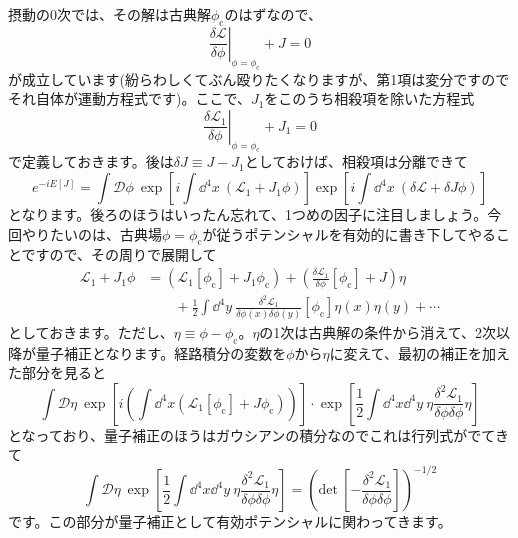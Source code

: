\documentclass[unicode,a4paper,11pt]{ltjsarticle}
\theoremstyle{definition}
\begin{document}
摂動の0次では、その解は古典解$\phi_{\mathrm{c}}$のはずなので、
\begin{equation}
   \left.
   \frac{\delta\mathcal{L}}{\delta\phi}
   \right|_{\phi=\phi_{\mathrm{c}}}
   +
   J
   =
   0
\end{equation}
が成立しています(紛らわしくてぶん殴りたくなりますが、第1項は変分ですのでそれ自体が運動方程式です)。ここで、$J_{1}$をこのうち相殺項を除いた方程式
\begin{equation}
   \left.
   \frac{\delta\mathcal{L}_1}{\delta\phi}
   \right|_{\phi=\phi_{\mathrm{c}}}
   +
   J_{1}
   =
   0
\end{equation}
で定義しておきます。後は$\delta J\equiv J-J_{1}$としておけば、相殺項は分離できて
\begin{equation}
   e^{-i E[J]}
   =
   \int\mathcal{D}\phi\
   \exp
   \left[
   i\int\dd^4 x\
   (\mathcal{L}_{1}+J_{1}\phi)
   \right]
   \exp
   \left[
      i\int\dd^4 x\
      (\delta\mathcal{L}+\delta J\phi)
      \right]
\end{equation}
となります。後ろのほうはいったん忘れて、1つめの因子に注目しましょう。今回やりたいのは、古典場$\phi=\phi_{\mathrm{c}}$が従うポテンシャルを有効的に書き下してやることですので、その周りで展開して
\begin{align}
   \mathcal{L}_{1}+J_{1}\phi
    & =
   \left(
   \mathcal{L}_{1}[\phi_{\mathrm{c}}]+J_{1}\phi_{\mathrm{c}}
   \right)
   +
   \left(
   \frac{\delta\mathcal{L}_{1}}{\delta\phi}[\phi_{\mathrm{c}}]
   +
   J
   \right)\eta
   \nonumber
   \\
    & \qquad
   +
   \frac{1}{2}\int\dd^4 y\
   \frac{\delta^2 \mathcal{L}_1}{\delta\phi(x)\delta\phi(y)}[\phi_{\mathrm{c}}]\eta(x)\eta(y)
   +
   \cdots
\end{align}
としておきます。ただし、$\eta\equiv\phi-\phi_{\mathrm{c}}$。$\eta$の1次は古典解の条件から消えて、2次以降が量子補正となります。経路積分の変数を$\phi$から$\eta$に変えて、最初の補正を加えた部分を見ると
\begin{equation}
   \int\mathcal{D}\eta\
   \exp
   \left[
   i
   \left(
   \int\dd^4 x (\mathcal{L}_{1}[\phi_{\mathrm{c}}]+J\phi_{\mathrm{c}})
   \right)
   \right]
   \cdot
   \exp
   \left[
      \frac{1}{2}
      \int\dd^4 x\dd^4 y\
      \eta\frac{\delta^2\mathcal{L}_{1}}{\delta\phi\delta\phi}\eta
      \right]
\end{equation}
となっており、量子補正のほうはガウシアンの積分なのでこれは行列式がでてきて
\begin{equation}
   \int\mathcal{D}\eta\
   \exp
   \left[
      \frac{1}{2}
      \int\dd^4 x\dd^4 y\
      \eta\frac{\delta^2\mathcal{L}_{1}}{\delta\phi\delta\phi}\eta
      \right]
   =
   \left(
   \mathrm{det\ }
   \left[
      -\frac{\delta^2\mathcal{L}_{1}}{\delta\phi\delta\phi}
      \right]
   \right)^{-1/2}
\end{equation}
です。この部分が量子補正として有効ポテンシャルに関わってきます。
\end{document}
